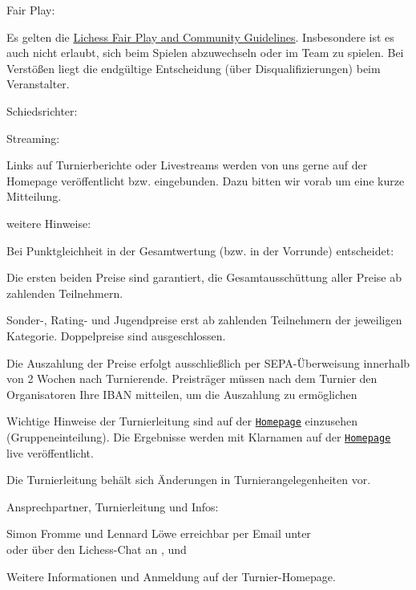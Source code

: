 \documentclass[paper=a4, fontsize=10pt]{scrartcl}
\begin{document}
\begin{basedescript}{\desclabelstyle{\multilinelabel}\desclabelwidth{10em}}
\item[Fair Play:]

  Es gelten die \href{\lichessTermsOfServiceURL}{Lichess Fair Play and
    Community Guidelines}. Insbesondere ist es auch nicht erlaubt,
  sich beim Spielen abzuwechseln oder im Team zu spielen. Bei
  Verstößen liegt die endgültige Entscheidung (über
  Disqualifizierungen) beim Veranstalter.

\item[Schiedsrichter:]

  \arbiter{}

\item[Streaming:]

  Links auf Turnierberichte oder Livestreams werden von uns gerne auf
  der Homepage veröffentlicht bzw. eingebunden. Dazu bitten wir vorab
  um eine kurze Mitteilung.

\item[weitere Hinweise:]

  Bei Punktgleichheit in der Gesamtwertung (bzw. in der Vorrunde)
  entscheidet:

  \enum{\tiebreak}

  Die ersten beiden Preise sind garantiert, die Gesamtausschüttung
  aller Preise ab \prizesGuaranteedMinParaticipants{} zahlenden
  Teilnehmern.

  Sonder-, Rating- und Jugendpreise erst ab
  \specialPrizesGuaranteedMinParaticipants{} zahlenden Teilnehmern der
  jeweiligen Kategorie. Doppelpreise sind ausgeschlossen.

  Die Auszahlung der Preise erfolgt ausschließlich per
  SEPA-Überweisung innerhalb von 2 Wochen nach
  Turnierende. Preisträger müssen nach dem Turnier den Organisatoren
  Ihre IBAN mitteilen, um die Auszahlung zu ermöglichen
  
  Wichtige Hinweise der Turnierleitung sind auf der
  \href{\tournamentURL}{\texttt{Homepage}} einzusehen
  (Gruppeneinteilung). Die Ergebnisse werden mit Klarnamen auf der
  \href{\tournamentURL}{\texttt{Homepage}} live veröffentlicht.

  Die Turnierleitung behält sich Änderungen in Turnierangelegenheiten
  vor.

\item[Ansprechpartner, Turnierleitung und Infos:]

  Simon Fromme und Lennard Löwe erreichbar per Email unter
  \\ \email{\tournamentEmail} oder über den Lichess-Chat an
  ,  und

  Weitere Informationen und Anmeldung auf der Turnier-Homepage.
\end{basedescript}
\end{document}
